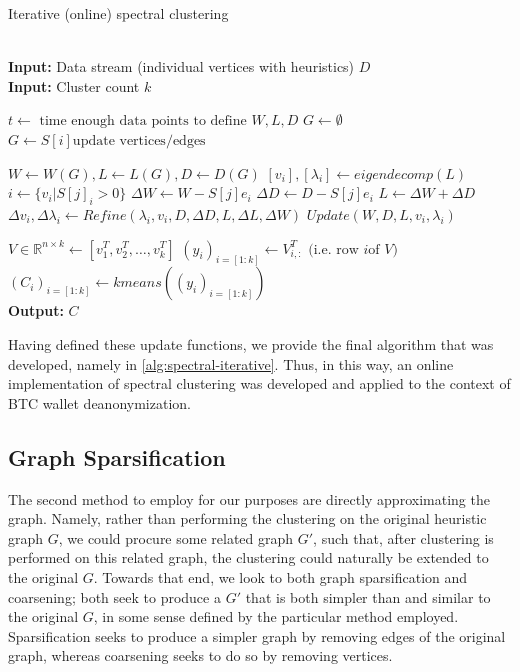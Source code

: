 \documentclass{article}
\begin{document}
\begin{algorithm}
\caption{Iterative (online) spectral clustering \cite{incremental}}\label{alg:spectral-iterative}
\begin{algorithmic}[1]
 \\
\textbf{Input:} Data stream (individual vertices with heuristics) $D$ \\
\textbf{Input:} Cluster count $k$

\State $t \gets\text{ time enough data points to define } W, L, D$
\State $G \gets \emptyset$
    \State $G \gets S[i] \text{update vertices/edges}$
\EndFor

\State $W\gets W(G), L\gets L(G), D\gets D(G)$
\State $[v_i], [\lambda_i] \gets eigendecomp(L)$
    \State $i \gets \{v_i|S[j]_i > 0\}$
    \State $\Delta W\gets W - S[j] e_i$
    \State $\Delta D\gets D - S[j] e_i$
    \State $L\gets \Delta W + \Delta D$
    \State $\Delta v_i, \Delta \lambda_i \gets Refine(\lambda_i, v_i, D, \Delta D, L, \Delta L, \Delta W)$
    \State $Update(W,D,L,v_i,\lambda_i)$
\EndWhile

\State $V\in\mathbb{R}^{n\times k} \gets [v_1^T, v_2^T,\dots,v_k^T]$
\State $(y_i)_{i=[1:k]} \gets V^T_{i,:} \text{ (i.e. row } i \text{of } V\text{)}$
\State $(C_i)_{i=[1:k]} \gets kmeans((y_i)_{i=[1:k]})$ \\

\textbf{Output:} $C$
\EndProcedure
\end{algorithmic}
\end{algorithm}

Having defined these update functions, we provide the final algorithm that was developed, namely in \ref{alg:spectral-iterative}. Thus, in this way, an online implementation of spectral clustering was developed and applied to the context of BTC wallet deanonymization.

\subsection{Graph Sparsification}
The second method to employ for our purposes are directly approximating the graph. Namely, rather than performing the clustering on the original heuristic graph $G$, we could procure some related graph $G'$, such that, after clustering is performed on this related graph, the clustering could naturally be extended to the original $G$. Towards that end, we look to both graph sparsification and coarsening; both seek to produce a $G'$ that is both simpler than and similar to the original $G$, in some sense defined by the particular method employed. Sparsification seeks to produce a simpler graph by removing edges of the original graph, whereas coarsening seeks to do so by removing vertices.
\end{document}
